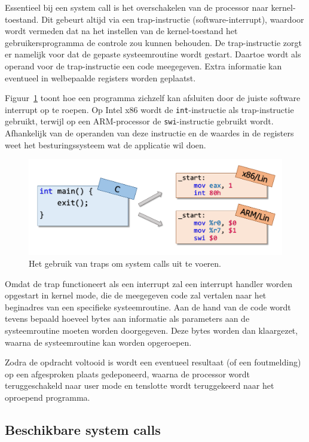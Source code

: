 Essentieel bij een system call is het overschakelen van de
processor naar kernel- toestand. Dit gebeurt altijd via een
trap-instructie (software-interrupt), waardoor wordt vermeden dat na
het instellen van de kernel-toestand het gebruikersprogramma de
controle zou kunnen behouden. De trap-instructie zorgt er namelijk
voor dat de gepaste systeemroutine wordt gestart. Daartoe wordt als
operand voor de trap-instructie een code meegegeven. Extra informatie kan
eventueel in welbepaalde registers worden geplaatst.

Figuur~\ref{fig:systemcalls} toont hoe een programma zichzelf kan afsluiten door
de juiste software interrupt op te roepen. Op Intel x86 wordt de \texttt{int}-instructie
als trap-instructie gebruikt, terwijl op een ARM-processor de \texttt{swi}-instructie
gebruikt wordt. Afhankelijk van de operanden van deze instructie en de waardes in de registers
weet het besturingssysteem wat de applicatie wil doen.

\begin{figure}
  \centering
  \includegraphics[scale=0.4]{images/IntInstructions.pdf}
  \caption{Het gebruik van traps om system calls uit te voeren.}\label{fig:systemcalls}
\end{figure}

Omdat de trap functioneert als een interrupt zal een interrupt
handler worden opgestart in kernel mode, die de meegegeven code zal
vertalen naar het beginadres van een specifieke systeemroutine. Aan de
hand van de code wordt tevens bepaald hoeveel bytes aan informatie als
parameters aan de systeemroutine moeten worden doorgegeven. Deze bytes
worden dan klaargezet, waarna de systeemroutine kan worden
opgeroepen.

Zodra de opdracht voltooid is wordt een eventueel resultaat (of
een foutmelding) op een afgesproken plaats gedeponeerd, waarna de
processor wordt teruggeschakeld naar user mode en tenslotte wordt
teruggekeerd naar het oproepend programma.

\subsection{Beschikbare system calls}

